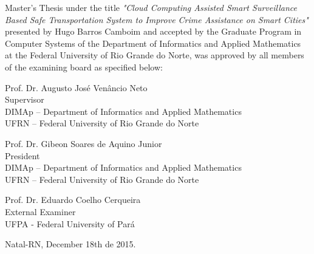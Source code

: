 \begin{folhadeaprovacao}
	\setlength{\ABNTsignthickness}{0.4pt}
	\setlength{\ABNTsignwidth}{10cm}
	
	\noindent 
	Master's Thesis under the title \textit{"Cloud Computing Assisted Smart Surveillance Based Safe Transportation System to Improve Crime Assistance on Smart Cities"} presented by Hugo Barros Camboim and accepted by the Graduate Program in Computer Systems of the Department of Informatics and Applied Mathematics at the Federal University of Rio Grande do Norte,  was approved by all members of the examining board as specified below:
		
	\assinatura
	{
		Prof. Dr. Augusto José Venâncio Neto   			                  \\
		{\small Supervisor}											          \smallskip\\ 
		{\footnotesize
			DIMAp -- Department of Informatics and Applied Mathematics 		   \\
		  	UFRN -- Federal University of Rio Grande do Norte
		}
   }
      
   \assinatura
	{
      Prof. Dr.  Gibeon Soares de Aquino Junior   			                  \\
		{\small President}											          \smallskip\\ 
		{\footnotesize
			DIMAp -- Department of Informatics and Applied Mathematics 		\\
		  	UFRN -- Federal University of Rio Grande do Norte
		}
   }   
   
   \assinatura
	{
      Prof. Dr. Eduardo Coelho Cerqueira   			                  \\
		{\small External Examiner}											          \smallskip\\ 
		{\footnotesize
			UFPA - Federal University of Pará
		}
	}
	
	
	
		
	\vfill
	
	\begin{center}
		Natal-RN, December 18th de 2015.
	\end{center}
\end{folhadeaprovacao}
